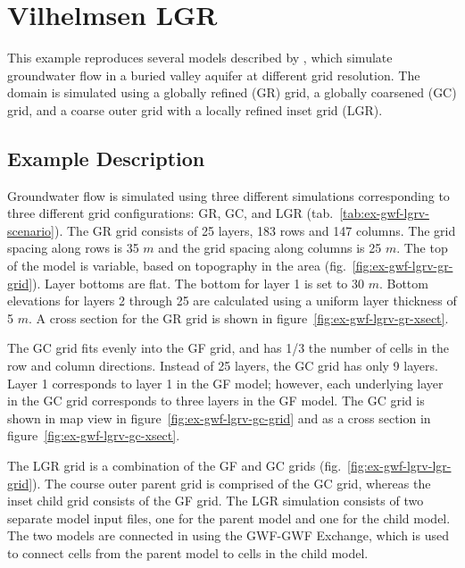 \section{Vilhelmsen LGR}

This example reproduces several models described by \cite{vilhelmsen2012}, which simulate groundwater flow in a buried valley aquifer at different grid resolution.  The domain is simulated using a globally refined (GR) grid, a globally coarsened (GC) grid, and a coarse outer grid with a locally refined inset grid (LGR).  

\subsection{Example Description}

Groundwater flow is simulated using three different simulations corresponding to three different grid configurations: GR, GC, and LGR (tab.~\ref{tab:ex-gwf-lgrv-scenario}).  The GR grid consists of 25 layers, 183 rows and 147 columns.  The grid spacing along rows is 35 $m$ and the grid spacing along columns is 25 $m$.  The top of the model is variable, based on topography in the area (fig.~\ref{fig:ex-gwf-lgrv-gr-grid}).  Layer bottoms are flat.  The bottom for layer 1 is set to 30 $m$.  Bottom elevations for layers 2 through 25 are calculated using a uniform layer thickness of 5 $m$.  A cross section for the GR grid is shown in figure~\ref{fig:ex-gwf-lgrv-gr-xsect}.

The GC grid fits evenly into the GF grid, and has 1/3 the number of cells in the row and column directions.  Instead of 25 layers, the GC grid has only 9 layers.  Layer 1 corresponds to layer 1 in the GF model; however, each underlying layer in the GC grid corresponds to three layers in the GF model.  The GC grid is shown in map view in figure~\ref{fig:ex-gwf-lgrv-gc-grid} and as a cross section in figure~\ref{fig:ex-gwf-lgrv-gc-xsect}.

The LGR grid is a combination of the GF and GC grids (fig.~\ref{fig:ex-gwf-lgrv-lgr-grid}).  The course outer parent grid is comprised of the GC grid, whereas the inset child grid consists of the GF grid.  The LGR simulation consists of two separate model input files, one for the parent model and one for the child model.  The two models are connected in \mf using the GWF-GWF Exchange, which is used to connect cells from the parent model to cells in the child model.

